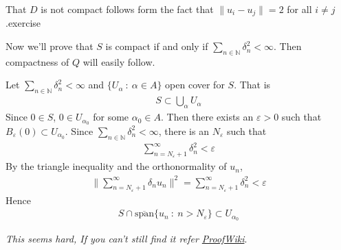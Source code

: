 \begin{solution}
  That $D$ is not compact follows form the fact that $\|u_i - u_j\| =
  2$ for all $i \neq j$.exercise

  Now we'll prove that $S$ is compact if and only if $\sum_{n \in
  \mathbb{N}} \delta_n^2 < \infty$. Then compactness of $Q$ will
  easily follow.

  Let $\sum_{n \in \mathbb{N}} \delta_n^2 < \infty$ and
  $\{ U_\alpha  \ : \   \alpha \in A \}$ open cover for $S$. That is
  \begin{align*}
    S \subset \bigcup_{\alpha} U_\alpha
  \end{align*}
  Since $0 \in S$, $0 \in U_{\alpha_0}$ for some $\alpha_0 \in A$.
  Then there exists an $\varepsilon > 0$ such that $B_\varepsilon(0)
  \subset U_{\alpha_0}$. Since $\sum_{n \in \mathbb{N}} \delta_n^2 <
  \infty$, there is an $N_\varepsilon$ such that
  \begin{align*}
    \sum_{n = N_\varepsilon+1}^{\infty}  \delta_n^2 < \varepsilon
  \end{align*}
  By the triangle inequality and the orthonormality of $u_n$,
  \begin{align*}
    \Big \| \sum_{n = N_\varepsilon + 1}^{\infty}  \delta_n u_n \Big
    \|^2 = \sum_{n = N_\varepsilon + 1}^{\infty} \delta_n^2 < \varepsilon
  \end{align*}
  Hence
  \begin{align*}
    S \cap \overline{\textrm{span}}\{ u_n  \ : \  n > N_\varepsilon
    \} \subset U_{\alpha_0}
  \end{align*}

  \textit{This seems hard, If you can't still find it refer
  \href{https://proofwiki.org/wiki/Hilbert_Cube_is_Compact}{ProofWiki}}.
\end{solution}

